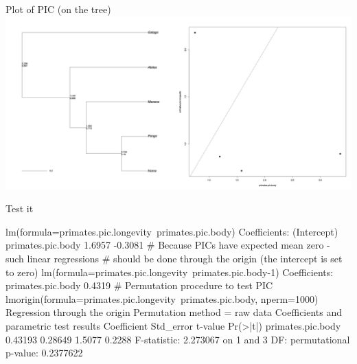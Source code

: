 \documentclass[compress, ucs, xelatex, 11pt, xcolor=svgnames,
  hyperref={
    bookmarks=true,
    unicode=true,
    colorlinks=true,
    pdftitle={Molecular data in R},
    plainpages=false,
    pdfauthor={Vojtech Zeisek},
    pdfsubject={Course about phylogeny and evolution in R},
    pdfcreator={XeLaTeX},
    pdfkeywords={R, evolution, phylogeny, molecular data},
    linkcolor=Tomato,
    anchorcolor=SaddleBrown,
    citecolor=Goldenrod,
    filecolor=DarkMagenta,
    menucolor=Sienna,
    urlcolor=DarkTurquoise,
    pdftex},
  url={hyphens, lowtilde} %
  ]{beamer}
\begin{document}
\begin{frame}{Plot of PIC (on the tree)}
  \includegraphics[width=\textwidth]{pic.png}
\end{frame}

\begin{frame}[fragile]{Test it}
  \begin{spluscode}
    lm(formula=primates.pic.longevity~primates.pic.body)
    Coefficients:
      (Intercept)  primates.pic.body
           1.6957            -0.3081
    # Because PICs have expected mean zero - such linear regressions
    # should be done through the origin (the intercept is set to zero)
    lm(formula=primates.pic.longevity~primates.pic.body-1)
    Coefficients:
    primates.pic.body
               0.4319
    # Permutation procedure to test PIC
    lmorigin(formula=primates.pic.longevity~primates.pic.body, nperm=1000)
    Regression through the origin
    Permutation method = raw data
    Coefficients and parametric test results
                       Coefficient Std_error t-value Pr(>|t|)
    primates.pic.body     0.43193   0.28649  1.5077   0.2288
    F-statistic: 2.273067 on 1 and 3 DF:
      permutational p-value: 0.2377622
  \end{spluscode}
\end{frame}
\end{document}
